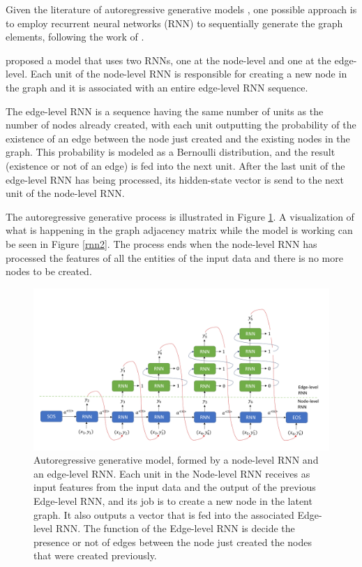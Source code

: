 \documentclass[12pt,a4paper]{article}
\begin{document}
	Given the literature of autoregressive generative models \citep{Li2018, You2018, Liao2019}, one possible approach is to employ recurrent neural networks (RNN) to sequentially generate the graph elements, following the work of \textcite{You2018}.

	\textcite{You2018} proposed a model that uses two RNNs, one at the node-level and one at the edge-level. Each unit of the node-level RNN is responsible for creating a new node in the graph and it is associated with an entire edge-level RNN sequence.

	The edge-level RNN is a sequence having the same number of units as the number of nodes already created, with each unit outputting the probability of the existence of an edge between the node just created and the existing nodes in the graph. This probability is modeled as a Bernoulli distribution, and the result (existence or not of an edge) is fed into the next unit. After the last unit of the edge-level RNN has being processed, its hidden-state vector is send to the next unit of the node-level RNN.

	The autoregressive generative process is illustrated in Figure \ref{rnn1}. A visualization of what is happening in the graph adjacency matrix while the model is working can be seen in Figure \ref{rnn2}. The process ends when the node-level RNN has processed the features of all the entities of the input data and there is no more nodes to be created.

	\begin{figure}[hbtp]
	\includegraphics[width=\textwidth]{rnn.png}
	\caption{Autoregressive generative model, formed by a node-level RNN and an edge-level RNN. Each unit in the Node-level RNN receives as input features from the input data and the output of the previous Edge-level RNN, and its job is to create a new node in the latent graph. It also outputs a vector that is fed into the associated Edge-level RNN. The function of the Edge-level RNN is decide the presence or not of edges between the node just created the nodes that were created previously. \label{rnn1}}
	\end{figure}
\end{document}
